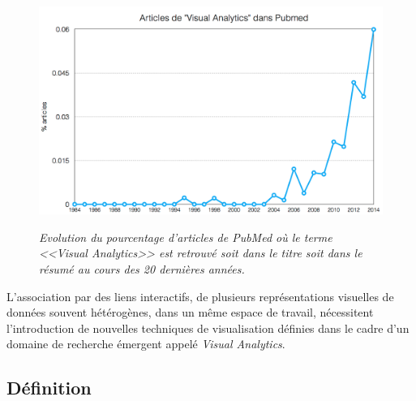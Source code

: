 \begin{figure}
  \centering
  {\includegraphics[width=.75\linewidth]{./figures/ch4/VA_pubmed_trend.png}}
    \caption[Évolution des articles traitant de \textit{Visual Analytics} dans PubMed.]{{\it Evolution du pourcentage d'articles de PubMed où le terme <<Visual Analytics>> est retrouvé soit dans le titre soit dans le résumé au cours des 20 dernières années.}}
  \label{Fig:VA_pubmed_trend}
  \hspace{0.3cm}
\end{figure}

L'association par des liens interactifs, de plusieurs représentations visuelles de données souvent hétérogènes,  dans un même espace de travail, nécessitent l'introduction de nouvelles techniques de visualisation définies dans le cadre d'un domaine de recherche émergent appelé \textit{Visual Analytics}.

\subsection{Définition}

